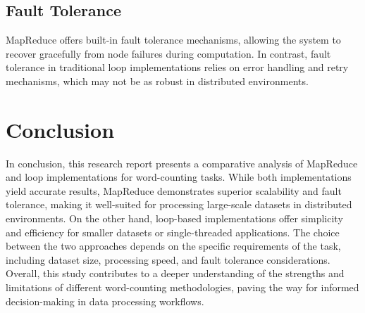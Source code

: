 \documentclass[]{acmsiggraph}
\begin{document}
\subsection{Fault Tolerance}
MapReduce offers built-in fault tolerance mechanisms, allowing the system to recover gracefully from node failures during computation. In contrast, fault tolerance in traditional loop implementations relies on error handling and retry mechanisms, which may not be as robust in distributed environments.

\section{Conclusion}

In conclusion, this research report presents a comparative analysis of MapReduce and loop implementations for word-counting tasks. While both implementations yield accurate results, MapReduce demonstrates superior scalability and fault tolerance, making it well-suited for processing large-scale datasets in distributed environments. On the other hand, loop-based implementations offer simplicity and efficiency for smaller datasets or single-threaded applications. The choice between the two approaches depends on the specific requirements of the task, including dataset size, processing speed, and fault tolerance considerations. Overall, this study contributes to a deeper understanding of the strengths and limitations of different word-counting methodologies, paving the way for informed decision-making in data processing workflows.



\end{document}
